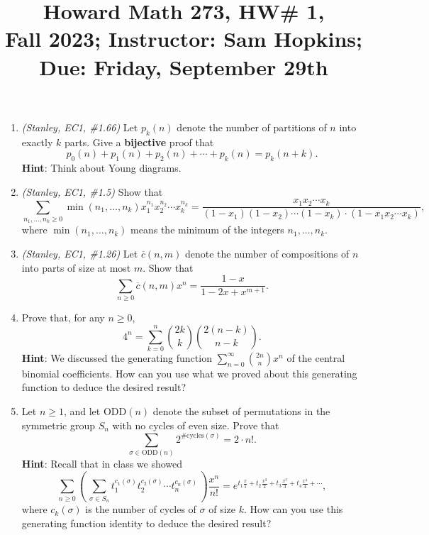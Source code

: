 \documentclass[11pt]{article}
\title{Howard Math 273, HW\# 1, \\ {\normalsize Fall 2023; Instructor: Sam Hopkins; Due: Friday, September 29th}}
\date{}
\begin{document}
\maketitle

\thispagestyle{empty}

\begin{enumerate}

\item \emph{(Stanley, EC1, \#1.66)} Let $p_k(n)$ denote the number of partitions of $n$ into exactly $k$ parts. Give a {\bf bijective} proof that
\[p_0(n)+p_1(n)+p_2(n)+\cdots + p_k(n) = p_k(n+k).\]
{\bf Hint}: Think about Young diagrams.

\item \emph{(Stanley, EC1, \#1.5)} Show that 
\[ \sum_{n_1,\ldots, n_k \geq 0} \min(n_1,\ldots,n_k) x_1^{n_1}x_2^{n_2}\cdots x_k^{n_k} = \frac{x_1x_2\cdots x_k}{(1-x_1)(1-x_2)\cdots(1-x_k) \cdot (1-x_1x_2\cdots x_k)}, \]
where $ \min(n_1,\ldots,n_k)$ means the minimum of the integers $n_1,\ldots,n_k$.

\item \emph{(Stanley, EC1, \#1.26)} Let $\overline{c}(n,m)$ denote the number of compositions of $n$ into parts of size at most $m$. Show that
\[ \sum_{n\geq 0} \overline{c}(n,m)x^n = \frac{1-x}{1-2x+x^{m+1}}.\]

\item Prove that, for any $n \geq 0$,
\[ 4^n = \sum_{k=0}^{n} \binom{2k}{k}\binom{2(n-k)}{n-k}. \]
{\bf Hint}: We discussed the generating function $\sum_{n=0}^{\infty} \binom{2n}{n}x^n$ of the central binomial coefficients. How can you use what we proved about this generating function to deduce the desired result?

\item Let $n \geq 1$, and let $\mathrm{ODD}(n)$ denote the subset of permutations in the symmetric group $S_n$ with no cycles of even size. Prove that
\[ \sum_{\sigma \in \mathrm{ODD}(n)} 2^{\#\mathrm{cycles}(\sigma)} = 2\cdot n!. \]
{\bf Hint}: Recall that in class we showed
\[ \sum_{n \geq 0}  \left( \, \sum_{\sigma\in S_n} t_1^{c_1(\sigma)} t_2^{c_2(\sigma)} \cdots t_n^{c_n(\sigma)} \, \right)  \frac{x^n}{n!} = e^{t_1 \frac{x}{1} + t_2\frac{x^2}{2} + t_3\frac{x^3}{3} + t_4\frac{x^4}{4} + \cdots},\]
where $c_k(\sigma)$ is the number of cycles of $\sigma$ of size $k$. How can you use this generating function identity to deduce the desired result?


\end{enumerate}
\end{document}
